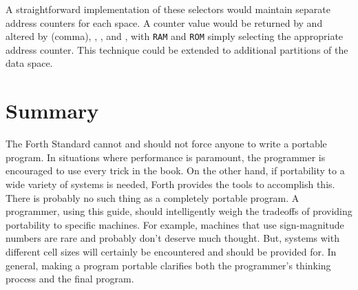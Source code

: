 A straightforward implementation of these selectors would maintain
separate address counters for each space. A counter value would be
returned by  and altered by \word{,} (comma), ,
, and , with \texttt{RAM} and \texttt{ROM}
simply selecting the appropriate address counter. This technique
could be extended to additional partitions of the data space.


\section{Summary} %

The  Forth Standard cannot and should not force anyone to write
a portable program. In situations where performance is paramount,
the programmer is encouraged to use every trick in the book. On the
other hand, if portability to a wide variety of systems is needed,
 Forth provides the tools to accomplish this. There is probably
no such thing as a completely portable program. A programmer, using
this guide, should intelligently weigh the tradeoffs of providing
portability to specific machines. For example, machines that use
sign-magnitude numbers are rare and probably don't deserve much
thought. But, systems with different cell sizes will certainly be
encountered and should be provided for. In general, making a program
portable clarifies both the programmer's thinking process and the
final program.
